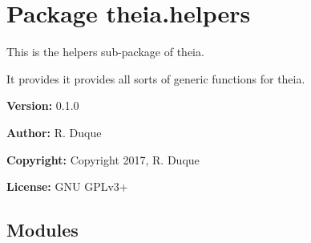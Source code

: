 %
%
%


\section{Package theia.helpers}

    \label{theia:helpers}
This is the helpers sub-package of theia.

It provides it provides all sorts of generic functions for theia.

\textbf{Version:} 0.1.0



\textbf{Author:} R. Duque



\textbf{Copyright:} Copyright 2017, R. Duque



\textbf{License:} GNU GPLv3+





\subsection{Modules}

